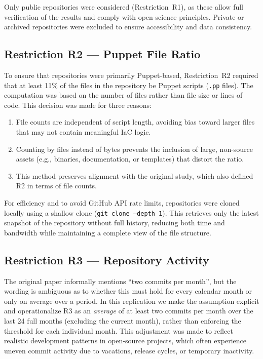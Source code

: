 \documentclass[conference]{IEEEtran}
\begin{document}
	Only public repositories were considered (Restriction~R1), as these allow full verification of the results and comply with open science principles. Private or archived repositories were excluded to ensure accessibility and data consistency.
	
	\subsection{Restriction R2 — Puppet File Ratio}
	To ensure that repositories were primarily Puppet-based, Restriction~R2 required that at least 11\% of the files in the repository be Puppet scripts (\texttt{.pp} files). The computation was based on the number of files rather than file size or lines of code. This decision was made for three reasons:
	
	\begin{enumerate}
		\item File counts are independent of script length, avoiding bias toward larger files that may not contain meaningful IaC logic.
		\item Counting by files instead of bytes prevents the inclusion of large, non-source assets (e.g., binaries, documentation, or templates) that distort the ratio.
		\item This method preserves alignment with the original study, which also defined R2 in terms of file counts.
	\end{enumerate}
	
	For efficiency and to avoid GitHub API rate limits, repositories were cloned locally using a shallow clone (\texttt{git clone --depth 1}). This retrieves only the latest snapshot of the repository without full history, reducing both time and bandwidth while maintaining a complete view of the file structure.
	
	
	\subsection{Restriction R3 — Repository Activity}
	The original paper informally mentions ``two commits per month'', but the wording is ambiguous as to whether this must hold for every calendar month or only on average over a period. In this replication we make the assumption explicit and operationalize R3 as an \textit{average} of at least two commits per month over the last 24 full months (excluding the current month), rather than enforcing the threshold for each individual month. This adjustment was made to reflect realistic development patterns in open-source projects, which often experience uneven commit activity due to vacations, release cycles, or temporary inactivity.
	
\end{document}
